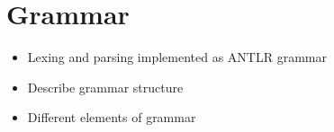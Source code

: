 \section{Grammar}
\begin{itemize}
    \item Lexing and parsing implemented as ANTLR grammar
    \item Describe grammar structure
    \item Different elements of grammar
\end{itemize}